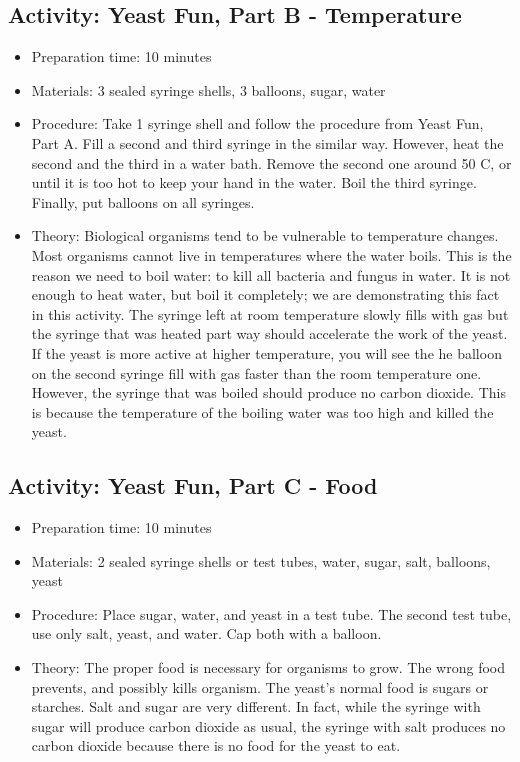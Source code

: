 \subsection{Activity: Yeast Fun, Part B - Temperature}
\begin{itemize}
\item{Preparation time: 10 minutes}
\item{Materials: 3 sealed syringe shells, 3 balloons, sugar, water}
\item{Procedure: Take 1 syringe shell and follow the procedure from Yeast Fun, Part A. Fill a second and third syringe in the similar way. However, heat the second and the third in a water bath. Remove the second one around 50 C, or until it is too hot to keep your hand in the water. Boil the third syringe. Finally, put balloons on all syringes.}
\item{Theory: Biological organisms tend to be vulnerable to temperature changes. Most organisms cannot live in temperatures where the water boils. This is the reason we need to boil water: to kill all bacteria and fungus in water. It is not enough to heat water, but boil it completely; we are demonstrating this fact in this activity. The syringe left at room temperature slowly fills with gas but the syringe that was heated part way should accelerate the work of the yeast. If the yeast is more active at higher temperature, you will see the he balloon on the second syringe fill with gas faster than the room temperature one. However, the syringe that was boiled should produce no carbon dioxide. This is because the temperature of the boiling water was too high and killed the yeast.}
\end{itemize}


\subsection{Activity: Yeast Fun, Part C - Food}
\begin{itemize}
\item{Preparation time: 10 minutes}
\item{Materials: 2 sealed syringe shells or test tubes, water, sugar, salt, balloons, yeast}
\item{Procedure: Place sugar, water, and yeast in a test tube. The second test tube, use only salt, yeast, and water. Cap both with a balloon.}
\item{Theory: The proper food is necessary for organisms to grow. The wrong food prevents, and possibly kills organism. The yeast’s normal food is sugars or starches. Salt and sugar are very different. In fact, while the syringe with sugar will produce carbon dioxide as usual, the syringe with salt produces no carbon dioxide because there is no food for the yeast to eat.}
\end{itemize}


